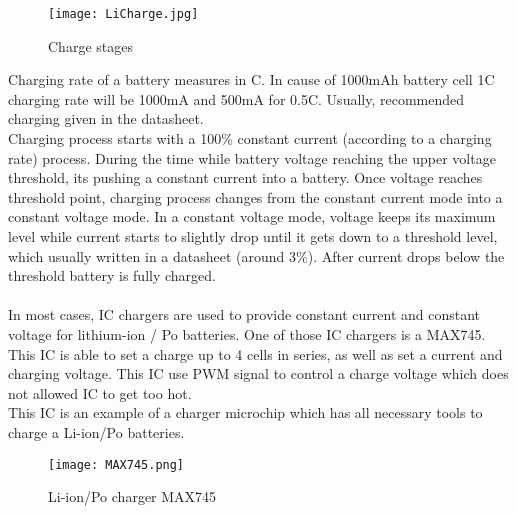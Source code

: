 \begin{figure}[h]
	\centering
	\texttt{[image: LiCharge.jpg]}
	\caption{ Charge stages \cite{14}}
	\label{fig: EPS}
\end{figure}
 Charging rate of a battery measures in C. In cause of 1000mAh battery cell 1C charging rate will be 1000mA and 500mA for 0.5C. Usually, recommended charging given in the datasheet.\\
 Charging process starts with a 100\%  constant current (according to a charging rate) process. During the time while battery voltage reaching the upper voltage threshold, its pushing a constant current into a battery. Once voltage reaches threshold point, charging process changes from the constant current mode into a constant voltage mode. In a constant voltage mode, voltage keeps its maximum level while current starts to slightly drop until it gets down to a threshold level, which usually written in a datasheet (around 3\%). After current drops below the threshold battery is fully charged. \\ \\
 In most cases, IC chargers are used to provide constant current and constant voltage for lithium-ion / Po batteries. \cite{14} One of those IC chargers is a MAX745. 
This IC is able to set a charge up to 4 cells in series, as well as set a current and charging voltage. This IC use PWM signal to control a charge voltage which does not allowed IC to get too hot.\\ This IC is an example of a charger microchip which has all necessary  tools to charge a Li-ion/Po batteries. 

\newpage

\begin{figure}[h]
	\centering
	\texttt{[image: MAX745.png]}
	\caption{ Li-ion/Po charger MAX745 \cite{15}}
	\label{fig: EPS}
\end{figure}

